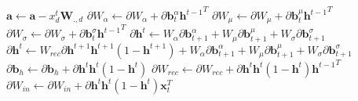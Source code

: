 \documentclass{article} %
\begin{document}
\begin{algorithm}
\begin{algorithmic}
\Else
	\State $\mathbf{a} \gets \mathbf{a} - x^{t}_d \mathbf{W}_{.,d}$
\EndIf
\EndFor
\State $\partial W_{\alpha} \gets \partial W_{\alpha} + \partial \mathbf{b}^{\alpha}_{t}{\mathbf{h}^{t-1}}^T$
\State $\partial W_{\mu} \gets \partial W_{\mu} + \partial \mathbf{b}^{\mu}_{t}{\mathbf{h}^{t-1}}^T$
\State $\partial W_{\sigma} \gets \partial W_{\sigma} + \partial \mathbf{b}^{\sigma}_{t}{\mathbf{h}^{t-1}}^T$
	\State $\partial \mathbf{h}^{t} \gets  W_{\alpha} \partial \mathbf{b}^{\alpha}_{t+1} + W_{\mu} \partial \mathbf{b}^{\mu}_{t+1} + W_{\sigma} \partial \mathbf{b}^{\sigma}_{t+1}$
\Else
	\State $\partial \mathbf{h}^{t} \gets W_{rec}\partial  \mathbf{h}^{t+1}\mathbf{h}^{t+1}(1-\mathbf{h}^{t+1}) + W_{\alpha} \partial \mathbf{b}^{\alpha}_{t+1} + W_{\mu} \partial \mathbf{b}^{\mu}_{t+1} + W_{\sigma} \partial \mathbf{b}^{\sigma}_{t+1}$
\EndIf
\State $\partial \mathbf{b}_h \gets \partial \mathbf{b}_h + \partial \mathbf{h}^{t} \mathbf{h}^{t} (1-\mathbf{h}^{t})$
\State $\partial W_{rec} \gets \partial W_{rec} + \partial \mathbf{h}^{t} \mathbf{h}^{t} (1-\mathbf{h}^{t}){\mathbf{h}^{t-1}}^T$
\State $\partial W_{in} \gets \partial W_{in} + \partial \mathbf{h}^{t} \mathbf{h}^{t} (1-\mathbf{h}^{t})\mathbf{x}_t^T$
\EndFor
\end{algorithmic}
\end{algorithm}

\newpage


\end{document}
